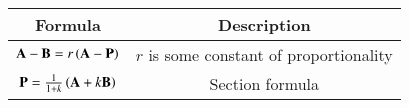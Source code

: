\begin{tabular}[12pt]{ |c| c|}
    \hline
    \textbf{Formula} & \textbf{Description}\\ 
    \hline
    $\mathbf{A}-\mathbf{B}=r\left(\mathbf{A}-\mathbf{P}\right)$ & $r$ is some constant of proportionality \\
    \hline 
    $\mathbf{P}=\frac{1}{1+k}\left(\mathbf{A}+k\mathbf{B}\right)$ & Section formula\\
    \hline   
    \end{tabular}
